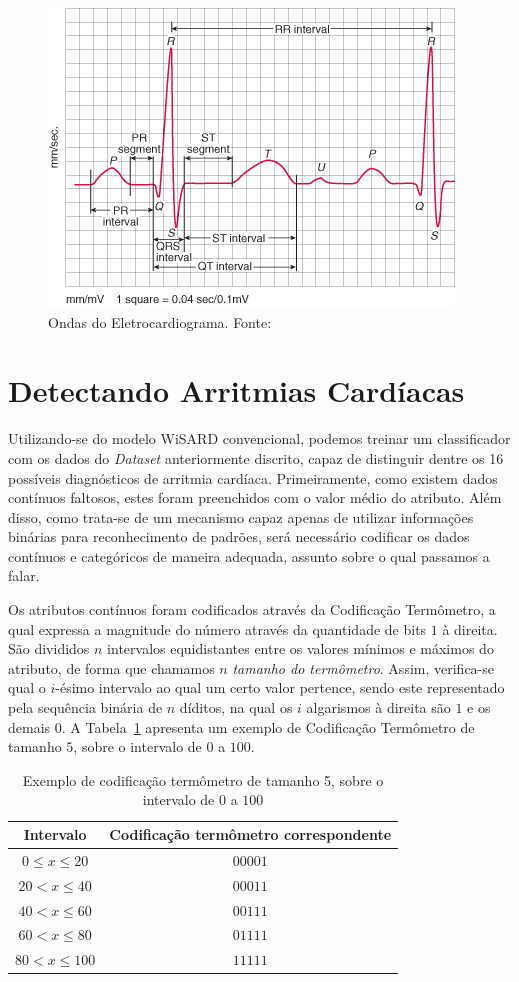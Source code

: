 \documentclass[12pt]{article}
\begin{document}
\begin{figure}[ht]
\centering
\includegraphics[width=.5\textwidth]{ecg.png}
\caption{Ondas do Eletrocardiograma. Fonte:~\cite{fastlane}}
\label{fig:ecg}
\end{figure}

\section{Detectando Arritmias Cardíacas} \label{sec:solucao}

Utilizando-se do modelo WiSARD convencional, podemos treinar um classificador com os dados do \emph{Dataset} anteriormente discrito, capaz de distinguir dentre os 16 possíveis diagnósticos de arritmia cardíaca. Primeiramente, como existem dados contínuos faltosos, estes foram preenchidos com o valor médio do atributo.
Além disso, como trata-se de um mecanismo capaz apenas de utilizar informações binárias para reconhecimento de padrões, será necessário codificar os dados contínuos e categóricos de maneira adequada, assunto sobre o qual passamos a falar.

Os atributos contínuos foram codificados através da Codificação Termômetro, a qual expressa a magnitude do número através da quantidade de bits $1$ à direita. São divididos $n$ intervalos equidistantes entre os valores mínimos e máximos do atributo, de forma que chamamos $n$ \emph{tamanho do termômetro}. Assim, verifica-se qual o $i$-ésimo intervalo ao qual um certo valor pertence, sendo este representado pela sequência binária de $n$ díditos, na qual os $i$ algarismos à direita são $1$ e os demais $0$. A Tabela~\ref{tab:termometro} apresenta um exemplo de Codificação Termômetro de tamanho $5$, sobre o intervalo de $0$ a $100$.

\begin{table}
\centering
 \begin{tabular}{cc} 
 Intervalo & Codificação termômetro correspondente \\ \hline
 $0\leq x \leq 20$ & $00001$ \\
 $20  < x \leq 40$ & $00011$ \\
 $40  < x \leq 60$ & $00111$ \\
 $60  < x \leq 80$ & $01111$ \\
 $80 < x \leq 100$ & $11111$ \\
 \end{tabular}
  \caption{Exemplo de codificação termômetro de tamanho 5, sobre o intervalo de $0$ a $100$} \label{tab:termometro}
\end{table}
\end{document}
